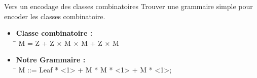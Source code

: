 \documentclass{beamer}
\begin{document}

\begin{frame}{Vers un encodage des classes combinatoires }
Trouver une grammaire simple pour encoder les classes combinatoire. \newline
\begin{itemize}
\item
\begin{tabbing}
\textbf{Classe combinatoire :} \\
\hspace{0.5cm} \= \kill
\> M = Z + Z $\times$ M $\times$ M + Z $\times$ M \\  %
\end{tabbing}


\item
\begin{tabbing}
\textbf{Notre Grammaire :} \\
\hspace{0.5cm} \= \kill
\> M ::= Leaf * <1> + M * M * <1> + M * <1>; \\
\end{tabbing}
\end{itemize} 

\end{frame}
\end{document}
